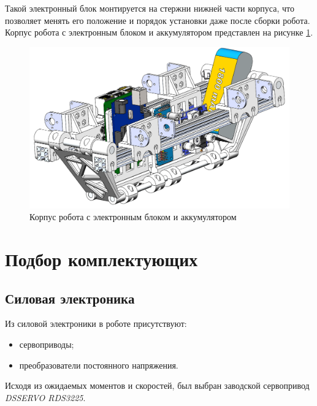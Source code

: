 Такой электронный блок монтируется на стержни нижней части корпуса, что позволяет менять его положение и порядок установки даже после сборки робота. Корпус робота с электронным блоком и аккумулятором представлен на рисунке \ref{fig:full_body}.
\begin{figure}[h]
    \centering
    \includegraphics[scale=0.45]{chapter_mechanics_construction/figure19.png}
    \caption{Корпус робота с электронным блоком и аккумулятором}
    \label{fig:full_body}
\end{figure}

\section{Подбор комплектующих}
\subsection{Силовая электроника}
Из силовой электроники в роботе присутствуют:
\begin{itemize}
    \item сервоприводы;
    \item преобразователи постоянного напряжения.
\end{itemize}

Исходя из ожидаемых моментов и скоростей, был выбран заводской сервопривод \textit{DSSERVO RDS3225}.

